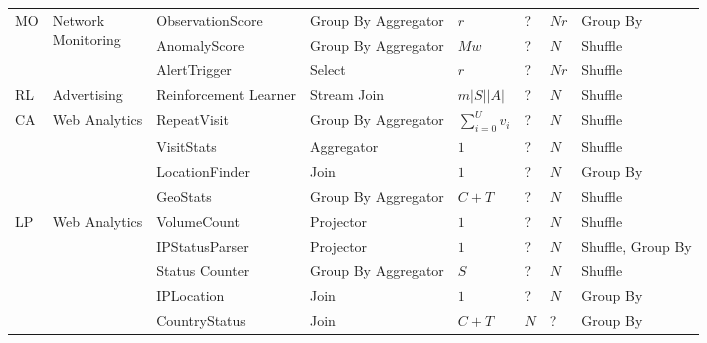 \documentclass[ppgc,diss,english]{iiufrgs}
\begin{document}
\begin{table}[h]
\begin{center}
\begin{tabular}{ | l | p{2.5cm} | p{2.5cm} | p{2cm} | l | l | l | p{1.5cm} | }
    		\multirow{2}{*}{MO} & \multirow{2}{*}{\parbox[t]{2.5cm}{Network\\Monitoring}} & ObservationScore & Group By Aggregator & $r$  & ? & $Nr$ & Group By \\\cline{3-8}
    					        &                                                         & AnomalyScore     & Group By Aggregator & $Mw$ & ? & $N$ & Shuffle \\\cline{3-8}
    					        &                                                         & AlertTrigger     & Select              & $r$  & ? & $Nr$ & Shuffle \\\hline
    					        
    		\multirow{1}{*}{RL} & \multirow{1}{*}{Advertising} & Reinforcement Learner & Stream Join & $m|S||A|$ & ? & $N$ & Shuffle \\\hline
    		
    		\multirow{2}{*}{CA} & \multirow{2}{*}{\parbox[t]{2.5cm}{Web Analytics}} & RepeatVisit    & Group By Aggregator & $\sum_{i=0}^{U}v_{i}$  & ? & $N$ & Shuffle \\\cline{3-8}
    					        &                                                   & VisitStats     & Aggregator          & $1$                    & ? & $N$ & Shuffle \\\cline{3-8}
    					        &                                                   & LocationFinder & Join                & $1$                    & ? & $N$ & Group By \\\cline{3-8}
    					        &                                                   & GeoStats       & Group By Aggregator & $C + T$                & ? & $N$ & Shuffle \\\hline
    					        
    		\multirow{2}{*}{LP} & \multirow{2}{*}{\parbox[t]{2.5cm}{Web Analytics}} & VolumeCount    & Projector 	       & $1$  & ? & $N$ & Shuffle \\\cline{3-8}
    					        &                                                   & IPStatusParser & Projector           & $1$  & ? & $N$ & Shuffle, Group By \\\cline{3-8}
    					        &                                                   & Status Counter & Group By Aggregator & $S$  & ? & $N$ & Shuffle \\\cline{3-8}
    					        &                                                   & IPLocation     & Join                & $1$  & ? & $N$ & Group By \\\cline{3-8}
    					        &                                                   & CountryStatus  & Join                & $C + T$  & $N$ & ? & Group By \\\hline
    					        

\end{tabular}
\end{center}
\end{table}
\end{document}
